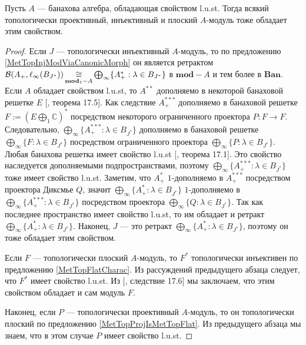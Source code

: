 \begin{proposition} Пусть $A$ --- банахова алгебра, обладающая свойством l.u.st. Тогда всякий топологически проективный, инъективный и плоский $A$-модуль тоже обладает этим свойством.
\end{proposition}
\begin{proof} Если $J$ --- топологически инъективный $A$-модуль, то по предложению \ref{MetTopInjModViaCanonicMorph} он является ретрактом $\mathcal{B}(A_+,\ell_\infty(B_{J^*}))\mathop{\mathbin{\cong}}\limits_{\mathbf{mod}_1-A}\bigoplus_\infty\{ A_+^*:\lambda\in B_{J^*}\}$ в $\mathbf{mod}-A$ и тем более в $\mathbf{Ban}$. Если $A$ обладает свойством l.u.st, то $A^{**}$ дополняемо в некоторой банаховой решетке $E$ [\cite{DiestAbsSumOps}, теорема 17.5]. Как следствие $A_+^{***}$ дополняемо в банаховой решетке $F:=\left(E\bigoplus_1\mathbb{C}\right)^*$ посредством некоторого ограниченного проектора $P:F\to F$. Следовательно, $\bigoplus_\infty\{A_+^{***}:\lambda\in B_{J^*}\}$ дополняемо в банаховой решетке $\bigoplus_\infty\{F:\lambda\in B_{J^*}\}$ посредством ограниченного проектора $\bigoplus_\infty\{ P:\lambda\in B_{J^*}\}$. Любая банахова решетка имеет свойство l.u.st [\cite{DiestAbsSumOps}, теорема 17.1]. Это свойство наследуется дополняемыми подпространствами, поэтому $\bigoplus_\infty\{A_+^{***}:\lambda\in B_{J^*}\}$ тоже имеет свойство l.u.st. Заметим, что $A_+^*$ $1$-дополняемо в $A_+^{***}$ посредством проектора Диксмье $Q$, значит $\bigoplus_\infty\{A_+^*:\lambda\in B_{J^*}\}$ $1$-дополняемо в $\bigoplus_\infty\{A_+^{***}:\lambda\in B_{J^*}\}$ посредством проектора $\bigoplus_\infty\{Q:\lambda\in B_{J^*}\}$. Так как последнее пространство имеет свойство l.u.st, то им обладает и ретракт $\bigoplus_\infty\{A_+^*:\lambda\in B_{J^*}\}$. Наконец, $J$ --- это ретракт $\bigoplus_\infty\{A_+^*:\lambda\in B_{J^*}\}$, поэтому он тоже обладает этим свойством.

Если $F$ --- топологически плоский $A$-модуль, то $F^*$ топологически инъективен по предложению \ref{MetTopFlatCharac}. Из рассуждений предыдущего абзаца следует, что $F^*$ имеет свойство l.u.st. Из [\cite{DiestAbsSumOps}, следствие 17.6] мы заключаем, что этим свойством обладает и сам модуль $F$.

Наконец, если $P$ --- топологически проективный $A$-модуль, то он топологически плоский по предложению \ref{MetTopProjIsMetTopFlat}. Из  предыдущего абзаца мы знаем, что в этом случае $P$ имеет свойство l.u.st.
\end{proof}


